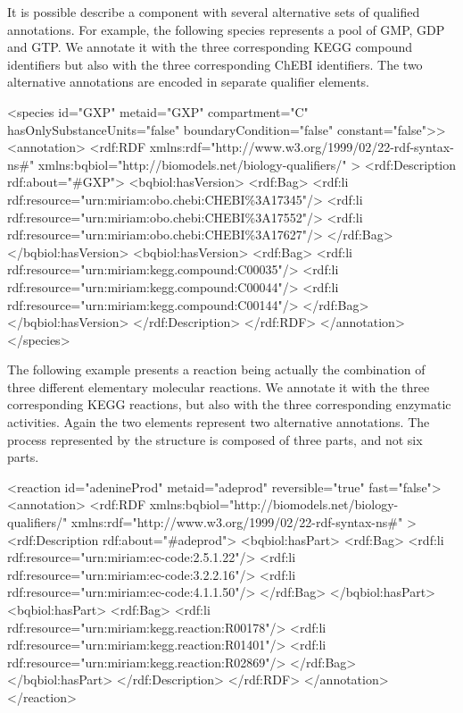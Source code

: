 It is possible describe a component with several alternative sets
of qualified annotations. For example, the following species
represents a pool of  GMP, GDP and GTP. We annotate it with the
three corresponding KEGG compound identifiers but also with the
three corresponding ChEBI identifiers.  The two alternative
annotations are encoded in separate  qualifier
elements.

\begin{example}
<species id="GXP" metaid="GXP" compartment="C"
         hasOnlySubstanceUnits="false" boundaryCondition="false"
         constant="false">>
  <annotation>
    <rdf:RDF
      xmlns:rdf="http://www.w3.org/1999/02/22-rdf-syntax-ns\#"
      xmlns:bqbiol="http://biomodels.net/biology-qualifiers/"
    >
      <rdf:Description rdf:about="\#GXP">
        <bqbiol:hasVersion>
          <rdf:Bag>
            <rdf:li rdf:resource="urn:miriam:obo.chebi:CHEBI\%3A17345"/>
            <rdf:li rdf:resource="urn:miriam:obo.chebi:CHEBI\%3A17552"/>
            <rdf:li rdf:resource="urn:miriam:obo.chebi:CHEBI\%3A17627"/>
          </rdf:Bag>
        </bqbiol:hasVersion>
        <bqbiol:hasVersion>
          <rdf:Bag>
            <rdf:li rdf:resource="urn:miriam:kegg.compound:C00035"/>
            <rdf:li rdf:resource="urn:miriam:kegg.compound:C00044"/>
            <rdf:li rdf:resource="urn:miriam:kegg.compound:C00144"/>
          </rdf:Bag>
        </bqbiol:hasVersion>
      </rdf:Description>
    </rdf:RDF>
  </annotation>
</species>
\end{example}

The following example presents a reaction being actually the
combination of three different elementary molecular reactions. We
annotate it with the three corresponding KEGG reactions, but also
with the three corresponding enzymatic activities.  Again the two
 elements represent two alternative annotations.
The process represented by the \Reaction structure is
composed of three parts, and  not six parts.

\begin{example}
<reaction id="adenineProd" metaid="adeprod" reversible="true" fast="false">
  <annotation>
    <rdf:RDF
      xmlns:bqbiol="http://biomodels.net/biology-qualifiers/"
      xmlns:rdf="http://www.w3.org/1999/02/22-rdf-syntax-ns\#"
    >
      <rdf:Description rdf:about="\#adeprod">
        <bqbiol:hasPart>
          <rdf:Bag>
            <rdf:li rdf:resource="urn:miriam:ec-code:2.5.1.22"/>
            <rdf:li rdf:resource="urn:miriam:ec-code:3.2.2.16"/>
            <rdf:li rdf:resource="urn:miriam:ec-code:4.1.1.50"/>
          </rdf:Bag>
        </bqbiol:hasPart>
        <bqbiol:hasPart>
          <rdf:Bag>
            <rdf:li rdf:resource="urn:miriam:kegg.reaction:R00178"/>
            <rdf:li rdf:resource="urn:miriam:kegg.reaction:R01401"/>
            <rdf:li rdf:resource="urn:miriam:kegg.reaction:R02869"/>
          </rdf:Bag>
        </bqbiol:hasPart>
      </rdf:Description>
    </rdf:RDF>
  </annotation>
</reaction>
\end{example}

